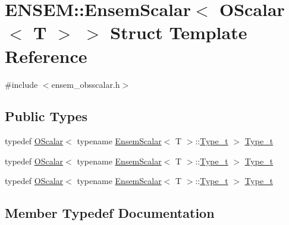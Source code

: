 \hypertarget{structENSEM_1_1EnsemScalar_3_01OScalar_3_01T_01_4_01_4}{}\section{E\+N\+S\+EM\+:\+:Ensem\+Scalar$<$ O\+Scalar$<$ T $>$ $>$ Struct Template Reference}
\label{structENSEM_1_1EnsemScalar_3_01OScalar_3_01T_01_4_01_4}


{\ttfamily \#include $<$ensem\+\_\+obsscalar.\+h$>$}

\subsection*{Public Types}
\begin{DoxyCompactItemize}
\item 
typedef \mbox{\hyperlink{classENSEM_1_1OScalar}{O\+Scalar}}$<$ typename \mbox{\hyperlink{structENSEM_1_1EnsemScalar}{Ensem\+Scalar}}$<$ T $>$\+::\mbox{\hyperlink{structENSEM_1_1EnsemScalar_3_01OScalar_3_01T_01_4_01_4_ae59bb2dba9a4ddf192256b4beaf9a856}{Type\+\_\+t}} $>$ \mbox{\hyperlink{structENSEM_1_1EnsemScalar_3_01OScalar_3_01T_01_4_01_4_ae59bb2dba9a4ddf192256b4beaf9a856}{Type\+\_\+t}}
\item 
typedef \mbox{\hyperlink{classENSEM_1_1OScalar}{O\+Scalar}}$<$ typename \mbox{\hyperlink{structENSEM_1_1EnsemScalar}{Ensem\+Scalar}}$<$ T $>$\+::\mbox{\hyperlink{structENSEM_1_1EnsemScalar_3_01OScalar_3_01T_01_4_01_4_ae59bb2dba9a4ddf192256b4beaf9a856}{Type\+\_\+t}} $>$ \mbox{\hyperlink{structENSEM_1_1EnsemScalar_3_01OScalar_3_01T_01_4_01_4_ae59bb2dba9a4ddf192256b4beaf9a856}{Type\+\_\+t}}
\item 
typedef \mbox{\hyperlink{classENSEM_1_1OScalar}{O\+Scalar}}$<$ typename \mbox{\hyperlink{structENSEM_1_1EnsemScalar}{Ensem\+Scalar}}$<$ T $>$\+::\mbox{\hyperlink{structENSEM_1_1EnsemScalar_3_01OScalar_3_01T_01_4_01_4_ae59bb2dba9a4ddf192256b4beaf9a856}{Type\+\_\+t}} $>$ \mbox{\hyperlink{structENSEM_1_1EnsemScalar_3_01OScalar_3_01T_01_4_01_4_ae59bb2dba9a4ddf192256b4beaf9a856}{Type\+\_\+t}}
\end{DoxyCompactItemize}


\subsection{Member Typedef Documentation}
\mbox{\label{structENSEM_1_1EnsemScalar_3_01OScalar_3_01T_01_4_01_4_ae59bb2dba9a4ddf192256b4beaf9a856}} 
